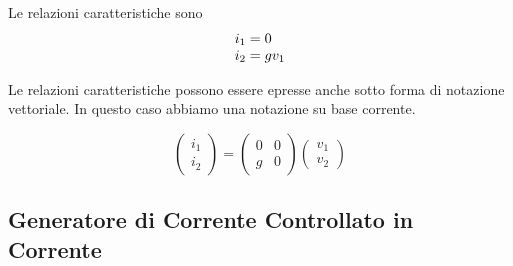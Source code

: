 \documentclass[a4paper]{report}
\begin{document}
Le relazioni caratteristiche sono
\[
\begin{array}{l l}
  i_1=0\\
  i_2=gv_1
\end{array}
\]

Le relazioni caratteristiche possono essere epresse anche sotto forma
di notazione vettoriale. In questo caso abbiamo una notazione su base
corrente.

\[
\left(
\begin{array}{c}
  i_1\\
  i_2
\end{array}
\right)=
\begin{pmatrix}
  0 & 0\\
  g & 0
\end{pmatrix}
\left(
\begin{array}{c}
  v_1\\
  v_2
\end{array}
\right)
\]

\subsection{Generatore di Corrente Controllato in Corrente}
\end{document}

